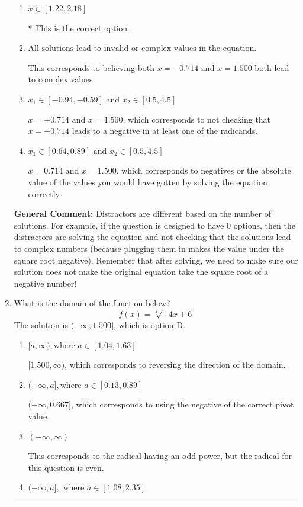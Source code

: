 \documentclass{extbook}[14pt]
\newcommand{\litem}[1]{\item #1

\rule{\textwidth}{0.4pt}}
\begin{document}
\begin{enumerate}
{\begin{enumerate}[label=\Alph*.]
$x = -0.714$, which corresponds to thinking this value does not make either radicand negative AND the value $x = 1.500$ does.
\item \( x \in [1.22,2.18] \)

* This is the correct option.
\item \( \text{All solutions lead to invalid or complex values in the equation.} \)

This corresponds to believing both $x = -0.714 \text{ and } x = 1.500$ both lead to complex values.
\item \( x_1 \in [-0.94, -0.59] \text{ and } x_2 \in [0.5,4.5] \)

$x = -0.714 \text{ and } x = 1.500$, which corresponds to not checking that $x = -0.714$ leads to a negative in at least one of the radicands.
\item \( x_1 \in [0.64, 0.89] \text{ and } x_2 \in [0.5,4.5] \)

$x = 0.714 \text{ and } x = 1.500$, which corresponds to negatives or the absolute value of the values you would have gotten by solving the equation correctly.
\end{enumerate}

\textbf{General Comment:} Distractors are different based on the number of solutions. For example, if the question is designed to have 0 options, then the distractors are solving the equation and not checking that the solutions lead to complex numbers (because plugging them in makes the value under the square root negative). Remember that after solving, we need to make sure our solution does not make the original equation take the square root of a negative number!
}
\litem{
What is the domain of the function below?
\[ f(x) = \sqrt[4]{-4 x + 6} \]The solution is \( (-\infty, 1.500] \), which is option D.\begin{enumerate}[label=\Alph*.]
\item \( [a, \infty), \text{where } a \in [1.04, 1.63] \)

 $[1.500, \infty)$, which corresponds to reversing the direction of the domain.
\item \( (-\infty, a], \text{where } a \in [0.13, 0.89] \)

$(-\infty, 0.667]$, which corresponds to using the negative of the correct pivot value.
\item \( (-\infty, \infty) \)

This corresponds to the radical having an odd power, but the radical for this question is even.
\item \( (-\infty, a], \text{ where } a \in [1.08, 2.35] \)


\end{enumerate}}
\end{enumerate}
\end{document}
